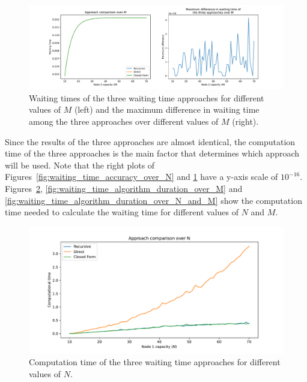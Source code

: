 \begin{figure}[H]
    \includegraphics[width=\textwidth]{chapters/03_queueing_model/img/numeric_results_and_timings/waiting_time_formulas_comparison/waiting_time_over_M.pdf}
    \caption{Waiting times of the three waiting time approaches for different
    values of \(M\) (left) and the maximum difference in waiting time among
    the three approaches over different values of \(M\) (right).}
    \label{fig:waiting_time_accuracy_over_M}
\end{figure}


Since the results of the three approaches are almost identical, the computation
time of the three approaches is the main factor that determines which
approach will be used.
Note that the right plots of Figures~\ref{fig:waiting_time_accuracy_over_N} and
\ref{fig:waiting_time_accuracy_over_M} have a y-axis scale of \(10^{-16}\).
Figures~\ref{fig:waiting_time_algorithm_duration_over_N}, 
\ref{fig:waiting_time_algorithm_duration_over_M} and 
\ref{fig:waiting_time_algorithm_duration_over_N_and_M} show the computation
time needed to calculate the waiting time for different values of \(N\) and
\(M\).

\begin{figure}[H]
    \includegraphics[width=\textwidth]{chapters/03_queueing_model/img/numeric_results_and_timings/waiting_time_formulas_comparison/algorithm_duration_over_N.pdf}
    \caption{Computation time of the three waiting time approaches for different values
    of \(N\).}
    \label{fig:waiting_time_algorithm_duration_over_N}
\end{figure}

